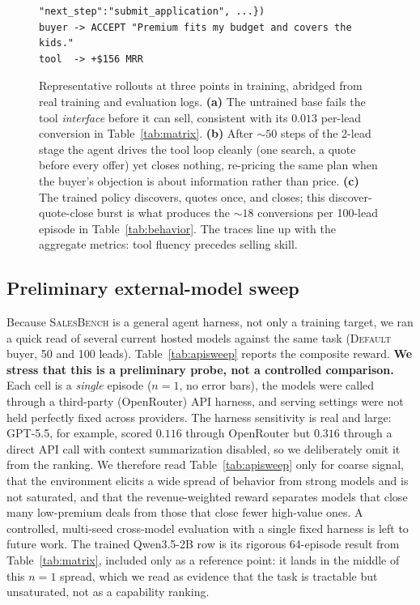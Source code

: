 \documentclass{article} %
\newcommand{\salesbench}{\textsc{SalesBench}}
\begin{document}
\begin{figure}[t]
\begin{lstlisting}[style=trace]
         "next_step":"submit_application", ...})
buyer -> ACCEPT "Premium fits my budget and covers the kids."
tool  -> +$156 MRR
\end{lstlisting}
\caption{Representative rollouts at three points in training, abridged from real training and evaluation logs.
\textbf{(a)} The untrained base fails the tool \emph{interface} before it can sell, consistent with its $0.013$ per-lead
conversion in Table~\ref{tab:matrix}. \textbf{(b)} After ${\sim}50$ steps of the 2-lead stage the agent drives the tool
loop cleanly (one search, a quote before every offer) yet closes nothing, re-pricing the same plan when the buyer's
objection is about information rather than price. \textbf{(c)} The trained policy discovers, quotes once, and closes;
this discover-quote-close burst is what produces the ${\sim}18$ conversions per 100-lead episode in
Table~\ref{tab:behavior}. The traces line up with the aggregate metrics: tool fluency precedes selling skill.}
\label{fig:trace}
\end{figure}

\subsection{Preliminary external-model sweep}
\label{app:apisweep}
Because \salesbench{} is a general agent harness, not only a training target, we ran a quick read of several current
hosted models against the same task (\textsc{Default} buyer, 50 and 100 leads). Table~\ref{tab:apisweep} reports the
composite reward. \textbf{We stress that this is a preliminary probe, not a controlled comparison.} Each cell is a
\emph{single} episode ($n{=}1$, no error bars), the models were called through a third-party (OpenRouter) API harness,
and serving settings were not held perfectly fixed across providers. The harness sensitivity is real and large: GPT-5.5,
for example, scored $0.116$ through OpenRouter but $0.316$ through a direct API call with context summarization disabled,
so we deliberately omit it from the ranking. We therefore read Table~\ref{tab:apisweep} only for coarse signal, that the
environment elicits a wide spread of behavior from strong models and is not saturated, and that the revenue-weighted
reward separates models that close many low-premium deals from those that close fewer high-value ones. A controlled,
multi-seed cross-model evaluation with a single fixed harness is left to future work. The trained Qwen3.5-2B row is its
rigorous 64-episode result from Table~\ref{tab:matrix}, included only as a reference point: it lands in the middle of
this $n{=}1$ spread, which we read as evidence that the task is tractable but unsaturated, not as a capability ranking.
\end{document}
